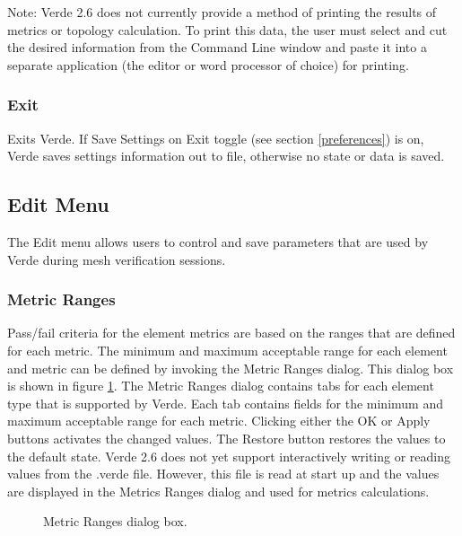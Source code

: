\documentclass[10pt]{report}
\begin{document}
Note:  Verde 2.6 does not currently provide a method of printing the 
results of metrics or topology calculation.   To print this data, the 
user must select and cut the desired information from the Command Line 
window and paste it into a separate application (the editor or word 
processor of choice) for printing.

\subsubsection{Exit}
\label{exit}

Exits Verde. If Save Settings on Exit toggle (see section \ref{preferences}) 
is on, Verde saves settings information out to file, otherwise no state 
or data is saved.

\subsection{Edit Menu}
\label{edit_menu}

The Edit menu allows users to control and save parameters that are 
used by Verde during mesh verification sessions.


\subsubsection{Metric Ranges}
\label{metric_ranges}

Pass/fail criteria for the element metrics are based on the ranges that 
are defined for each metric.  The minimum and maximum acceptable range 
for each element and metric can be defined by invoking the Metric 
Ranges dialog.  This dialog box is shown in figure \ref{fig:metric_ranges}.  
The Metric 
Ranges dialog contains tabs for each element type that is supported by 
Verde.  Each tab contains fields for the minimum and maximum acceptable 
range for each metric.  Clicking either the OK or Apply buttons activates 
the changed values.  The Restore button restores the values to the 
default state.  Verde 2.6 does not yet support interactively writing or 
reading values from the .verde file.  However, this file is read at 
start up and the values are displayed in the Metrics Ranges dialog and 
used for metrics calculations.

\htmlrule
\begin{figure}[tbh]
  \begin{center}
              {}
    \caption{Metric Ranges dialog box.}
    \label{fig:metric_ranges}
  \end{center}
\end{figure}     
\end{document}
